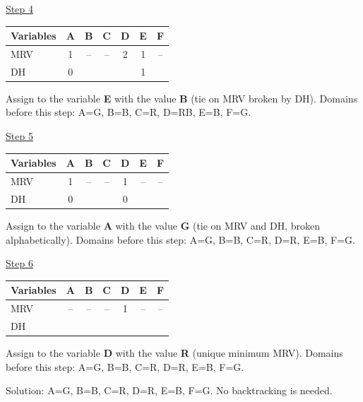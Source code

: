 \documentclass[11pt,a4paper]{article}
\begin{document}
\begin{solbox}
\underline{Step 4}\par\begin{center}\small \begin{tabular}{|l|c|c|c|c|c|c|}\hline Variables & \textbf{A} & \textbf{B} & \textbf{C} & \textbf{D} & \textbf{E} & \textbf{F}\\ \hline MRV & \textcolor{blue!60!black}{1} & -- & -- & \textcolor{blue!60!black}{2} & \textcolor{blue!60!black}{1} & --\\ \hline DH & \textcolor{blue!60!black}{0} &  &  &  & \textcolor{blue!60!black}{1} & \\ \hline\end{tabular}\end{center}Assign to the variable \textbf{E} with the value \textbf{B} (tie on MRV broken by DH). Domains before this step: A=G, B=B, C=R, D=RB, E=B, F=G.\par
\underline{Step 5}\par\begin{center}\small \begin{tabular}{|l|c|c|c|c|c|c|}\hline Variables & \textbf{A} & \textbf{B} & \textbf{C} & \textbf{D} & \textbf{E} & \textbf{F}\\ \hline MRV & \textcolor{blue!60!black}{1} & -- & -- & \textcolor{blue!60!black}{1} & -- & --\\ \hline DH & \textcolor{blue!60!black}{0} &  &  & \textcolor{blue!60!black}{0} &  & \\ \hline\end{tabular}\end{center}Assign to the variable \textbf{A} with the value \textbf{G} (tie on MRV and DH, broken alphabetically). Domains before this step: A=G, B=B, C=R, D=R, E=B, F=G.\par
\underline{Step 6}\par\begin{center}\small \begin{tabular}{|l|c|c|c|c|c|c|}\hline Variables & \textbf{A} & \textbf{B} & \textbf{C} & \textbf{D} & \textbf{E} & \textbf{F}\\ \hline MRV & -- & -- & -- & \textcolor{blue!60!black}{1} & -- & --\\ \hline DH &  &  &  &  &  & \\ \hline\end{tabular}\end{center}Assign to the variable \textbf{D} with the value \textbf{R} (unique minimum MRV). Domains before this step: A=G, B=B, C=R, D=R, E=B, F=G.\par Solution: A=G, B=B, C=R, D=R, E=B, F=G. No backtracking is needed.
\end{solbox}
\end{document}
